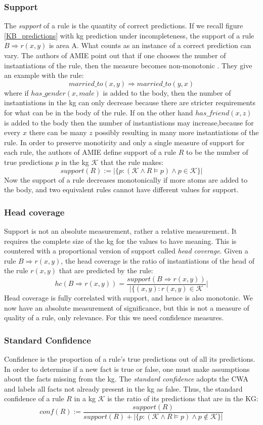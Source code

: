 \subsubsection{Support}
The \textit{support} of a rule is the quantity of correct predictions. If we recall figure \cref{KB_predictions} with \gls{kg} prediction under incompleteness, the support of a rule $B \Rightarrow r(x,y)$ is area A. What counts as an instance of a correct prediction can vary. The authors of AMIE point out that if one chooses the number of instantiations of the rule, then the measure becomes non-monotonic \cite{amie3}. They give an example with the rule:
\[married\_to(x, y) \Rightarrow married\_to(y, x)\]
where if $has\_gender(x, male)$ is added to the body, then the number of instantiations in the \gls{kg} can only decrease because there are stricter requirements for what can be in the body of the rule. If on the other hand $has\_friend(x, z)$ is added to the body then the number of instantiations may increase,because for every $x$ there can be many $z$ possibly resulting in many more instantiations of the rule. In order to preserve monoticity and only a single measure of support for each rule, the authors of AMIE define support of a rule $R$ to be the number of true predictions $p$ in the \gls{kg} $\mathcal{K}$ that the rule makes:
\[support(R) :=  | \{p : (\mathcal{K} \wedge R \models p)\wedge p \in \mathcal{K} \}|\]
Now the support of a rule decreases monotonically if more atoms are added to the body, and two equivalent rules cannot have different values for support.

\subsubsection{Head coverage}
Support is not an absolute measurement, rather a relative measurement. It requires the complete size of the \gls{kg} for the values to have meaning. This is countered with a proportional version of support called \emph{head coverage}. Given a rule $B \Rightarrow r(x,y)$, the head coverage is the ratio of instantiations of the head of the rule $r(x, y)$ that are predicted by the rule:
\[hc(B \Rightarrow r(x,y)) = \frac{support(B \Rightarrow r(x,y))}{|\{(x, y) : r(x, y) \in \mathcal{K}}|\]
Head coverage is fully correlated with support, and hence is also monotonic. We now have an absolute measurement of significance, but this is not a measure of quality of a rule, only relevance. For this we need confidence measures.


\subsubsection{Standard Confidence} Confidence is the proportion of a rule's true predictions out of all its predictions. In order to determine if a new fact is true or false, one must make assumptions about the facts missing from the \gls{kg}. The \textit{standard confidence} adopts the CWA and labels all facts not already present in the \gls{kg} as false. Thus, the standard confidence of a rule $R$ in a \gls{kg} $\mathcal{K}$ is the ratio of its predictions that are in the KG:
\[conf(R) := \frac{support(R)}{support(R) + | \{p : (\mathcal{K} \wedge R \models p)\wedge p \not\in \mathcal{K} \}|}\]

